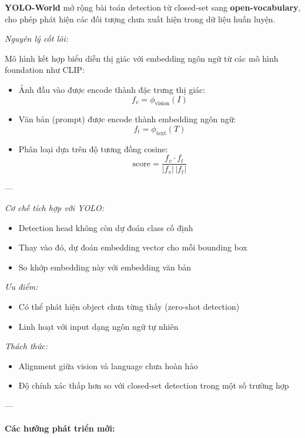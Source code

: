 \textbf{YOLO-World} mở rộng bài toán detection từ closed-set sang \textbf{open-vocabulary}, cho phép phát hiện các đối tượng chưa xuất hiện trong dữ liệu huấn luyện.

\textit{Nguyên lý cốt lõi:}

Mô hình kết hợp biểu diễn thị giác với embedding ngôn ngữ từ các mô hình foundation như CLIP:

\begin{itemize}
	\item Ảnh đầu vào được encode thành đặc trưng thị giác:
	\[
	f_v = \phi_{\text{vision}}(I)
	\]
	
	\item Văn bản (prompt) được encode thành embedding ngôn ngữ:
	\[
	f_t = \phi_{\text{text}}(T)
	\]
	
	\item Phân loại dựa trên độ tương đồng cosine:
	\[
	\text{score} = \frac{f_v \cdot f_t}{|f_v| \, |f_t|}
	\]
\end{itemize}

---

\textit{Cơ chế tích hợp với YOLO:}

\begin{itemize}
	\item Detection head không còn dự đoán class cố định
	\item Thay vào đó, dự đoán embedding vector cho mỗi bounding box
	\item So khớp embedding này với embedding văn bản
\end{itemize}

\textit{Ưu điểm:}
\begin{itemize}
	\item Có thể phát hiện object chưa từng thấy (zero-shot detection)
	\item Linh hoạt với input dạng ngôn ngữ tự nhiên
\end{itemize}

\textit{Thách thức:}
\begin{itemize}
	\item Alignment giữa vision và language chưa hoàn hảo
	\item Độ chính xác thấp hơn so với closed-set detection trong một số trường hợp
\end{itemize}

---

\paragraph{Các hướng phát triển mới:}

